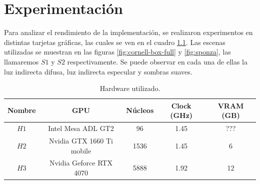 \graphicspath{{chapters/5_experimentos/figures/}}

\chapter{Experimentación}\label{chap:experiments}

Para analizar el rendimiento de la implementación, se realizaron experimentos en distintas tarjetas gráficas, las cuales se ven en el cuadro \ref{tab:hardware-used}.
Las escenas utilizadas se muestran en las figuras \ref{fig:cornell-box-full} y \ref{fig:sponza}, las llamaremos $S1$ y $S2$ respectivamente.
Se puede observar en cada una de ellas la luz indirecta difusa, luz indirecta especular y sombras suaves.

\begin{table}[ht]
	\centering
	\begin{tabular}{|c|c|c|c|c|}
		\hline
		\textbf{Nombre} & \textbf{GPU} & \textbf{Núcleos} & \textbf{Clock (GHz)} & \textbf{VRAM (GB)} \\
		\hline
		$H1$ & Intel Mesa ADL GT2 & 96 & 1.45 & ??? \\
		\hline
		$H2$ & Nvidia GTX 1660 Ti mobile & 1536 & 1.45 & 6 \\
		\hline
		$H3$ & Nvidia Geforce RTX 4070 & 5888 & 1.92 & 12 \\
		\hline
	\end{tabular}
	\caption{Hardware utilizado.}
	\label{tab:hardware-used}
\end{table}

